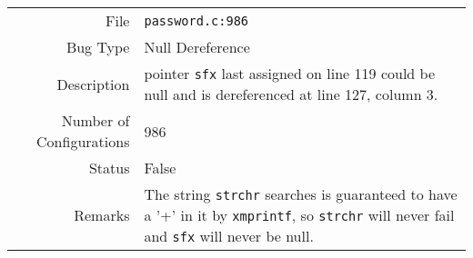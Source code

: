 \noindent\begin{tabularx}{\textwidth}{rY}
  \toprule
  File & \texttt{password.c:986}\\
  Bug Type & Null Dereference\\
  Description & pointer \texttt{sfx} last assigned on line 119 could be null and is dereferenced at line 127, column 3.\\
  Number of Configurations & 986\\
  \midrule
  Status & False\\
  Remarks & The string \texttt{strchr} searches is guaranteed to have a '+' in it by \texttt{xmprintf}, so \texttt{strchr} will never fail and \texttt{sfx} will never be null.\\
  \bottomrule
\end{tabularx}

\pagebreak
  

